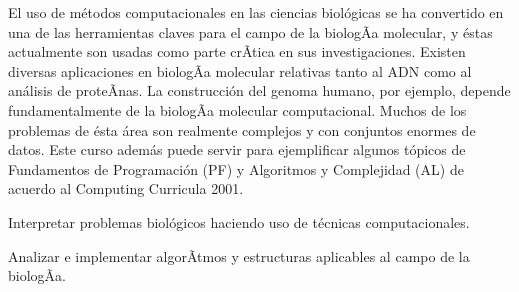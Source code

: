 \begin{syllabus}


\begin{justification}
El uso de métodos computacionales en las ciencias biológicas
se ha convertido en una de las herramientas claves para el
campo de la biologÃ­a molecular, y éstas actualmente son usadas
como parte crÃ­tica en sus investigaciones. Existen diversas
aplicaciones en biologÃ­a molecular relativas tanto al ADN como
al análisis de proteÃ­nas. La construcción del genoma humano,
por ejemplo, depende fundamentalmente de la biologÃ­a molecular
computacional. Muchos de los problemas de ésta área son realmente
complejos y con conjuntos enormes de datos. Este curso además
puede servir para ejemplificar algunos tópicos de Fundamentos
de Programación (PF) y Algoritmos y Complejidad (AL) de
acuerdo al Computing Curricula 2001.
\end{justification}

\begin{goals}
\item Interpretar problemas biológicos haciendo uso de técnicas computacionales.
\item Analizar e implementar algorÃ­tmos y estructuras aplicables al campo de la biologÃ­a.
\end{goals}

\begin{outcomes}
\end{outcomes}


\end{syllabus}
